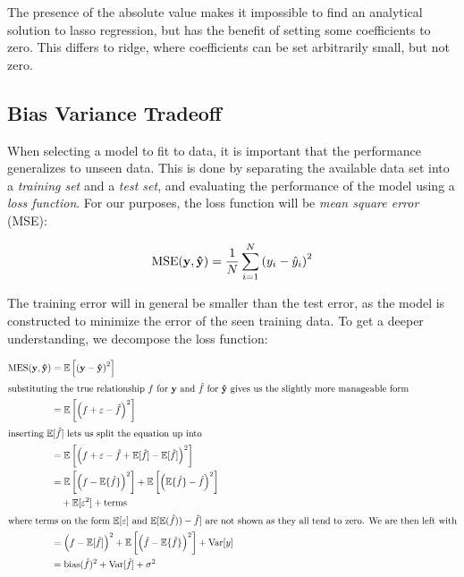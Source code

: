 The presence of the absolute value makes it impossible to find an analytical
solution to lasso regression, but has the benefit of setting some coefficients
to zero. This differs to ridge, where coefficients can be set arbitrarily small,
but not zero. 

\subsection{Bias Variance Tradeoff}\label{sec:bias-vari-trad} 

When selecting a model to fit to data, it is important that the performance
generalizes to unseen data. This is done by separating the available data set
into a \textit{training set} and a \textit{test set}, and evaluating the
performance of the model using a \textit{loss function}. For our purposes, the
loss function will be \textit{mean square error} (MSE):

\begin{equation*}
  \text{MSE}(\vb{y}, \vb{\hat{y}}) = \frac{1}{N}\sum_{i=1}^{N}\left( y_{i} - \hat{y}_{i} \right)^{2}
\end{equation*}

The training error will in general be smaller than the test error, as the model
is constructed to minimize the error of the seen training data. To get a deeper
understanding, we decompose the loss function:

\begin{align*}
  \text{MES}(\vb{y}, \vb{\hat{y}}) &= \operatorname{\mathbb{E}}\left[ \left( \vb{y} - \vb{\hat{y}} \right)^{2} \right]\\
  \intertext{substituting the true relationship \(f\) for \(\vb{y}\) and \(\hat f\) for \(\vb{\hat{y}}\)
  gives us the slightly more manageable form}
  &= \operatorname{\mathbb{E}}\left[ \left( f + \varepsilon - \hat f \right)^{2} \right]\\
    \intertext{inserting \(\operatorname{\mathbb{E}}[\hat f]\) lets us split the equation up into}
  &= \operatorname{\mathbb{E}}\left[ \left( f + \varepsilon - \hat f + \operatorname{\mathbb{E}}[\hat f] - \operatorname{\mathbb{E}}[\hat f] \right)^{2} \right]\\
                                   &= \operatorname{\mathbb{E}}\left[\left( f - \operatorname{\mathbb{E}}\{\hat f\} \right)^{2}\right] + \operatorname{\mathbb{E}}\left[ \left( \operatorname{\mathbb{E}}\{\hat f\} - \hat f \right)^{2} \right]\\
  &\quad + \operatorname{\mathbb{E}}[\varepsilon^{2}] + \text{terms}\\
  \intertext{where terms on the form \(\operatorname{\mathbb{E}}[\varepsilon]\) and \(\operatorname{\mathbb{E}}[\operatorname{\mathbb{E}}(\hat f)) - \hat f]\) are not shown as they all tend to zero. We are then left with}
                                   &= \left( f - \operatorname{\mathbb{E}}[\hat f] \right)^{2} + \operatorname{\mathbb{E}}\left[\left(\hat f - \operatorname{\mathbb{E}}\{\hat f\}  \right)^{2}\right] + \text{Var}[y]\\
  &= \text{bias}(\hat f)^{2} + \text{Var}[\hat f]  + \sigma^{2}
\end{align*}

